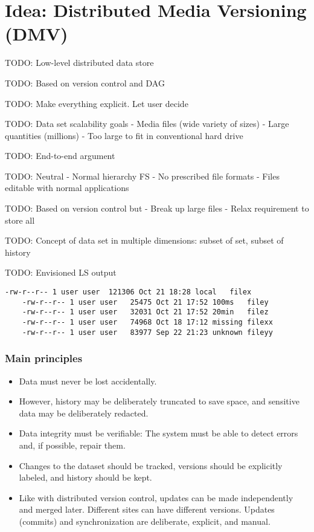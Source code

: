 \chapter{Idea: Distributed Media Versioning (DMV)}

TODO: Low-level distributed data store

TODO: Based on version control and DAG

TODO: Make everything explicit. Let user decide

TODO: Data set scalability goals
    - Media files (wide variety of sizes)
    - Large quantities (millions)
    - Too large to fit in conventional hard drive

TODO: End-to-end argument

TODO: Neutral
    - Normal hierarchy FS
    - No prescribed file formats
    - Files editable with normal applications

TODO: Based on version control but
    - Break up large files
    - Relax requirement to store all

TODO: Concept of data set in multiple dimensions: subset of set, subset of
history


TODO: Envisioned LS output

\begin{lstlisting}[caption=Example ls output]
    -rw-r--r-- 1 user user  121306 Oct 21 18:28 local   filex
    -rw-r--r-- 1 user user   25475 Oct 21 17:52 100ms   filey
    -rw-r--r-- 1 user user   32031 Oct 21 17:52 20min   filez
    -rw-r--r-- 1 user user   74968 Oct 18 17:12 missing filexx
    -rw-r--r-- 1 user user   83977 Sep 22 21:23 unknown fileyy
\end{lstlisting}



\subsection{Main principles}

\begin{itemize}

  \item Data must never be lost accidentally.

  \item However, history may be deliberately truncated to save space, and
    sensitive data may be deliberately redacted.

  \item Data integrity must be verifiable: The system must be able to detect
    errors and, if possible, repair them.

  \item Changes to the dataset should be tracked, versions should be explicitly
    labeled, and history should be kept.

  \item Like with distributed version control, updates can be made independently
    and merged later. Different sites can have different versions. Updates
    (commits) and synchronization are deliberate, explicit, and manual.

\end{itemize}


